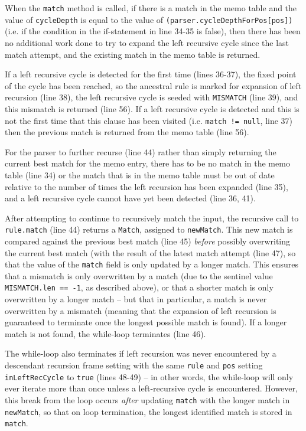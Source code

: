 \documentclass[manuscript]{acmart}
\begin{document}
When the \texttt{match} method is called, if there is a match in the memo table and the value of \texttt{cycleDepth} is equal to the value of \texttt{(parser.cycleDepthForPos[pos])} (i.e. if the condition in the if-statement in line 34-35 is false), then there has been no additional work done to try to expand the left recursive cycle since the last match attempt, and the existing match in the memo table is returned.

If a left recursive cycle is detected for the first time (lines 36-37), the fixed point of the cycle has been reached, so the ancestral rule is marked for expansion of left recursion (line 38), the left recursive cycle is seeded with \texttt{MISMATCH} (line 39), and this mismatch is returned (line 56). If a left recursive cycle is detected and this is not the first time that this clause has been visited (i.e. \texttt{match != null}, line 37) then the previous match is returned from the memo table (line 56).

For the parser to further recurse (line 44) rather than simply returning the current best match for the memo entry, there has to be no match in the memo table (line 34) or the match that is in the memo table must be out of date relative to the number of times the left recursion has been expanded (line 35), and a left recursive cycle cannot have yet been detected (line 36, 41).

After attempting to continue to recursively match the input, the recursive call to \texttt{rule.match} (line 44) returns a \texttt{Match}, assigned to \texttt{newMatch}. This new match is compared against the previous best match (line 45) \emph{before} possibly overwriting the current best match (with the result of the latest match attempt (line 47), so that the value of the \texttt{match} field is only updated by a longer match. This ensures that a mismatch is only overwritten by a match (due to the sentinel value \texttt{MISMATCH.len == -1}, as described above), or that a shorter match is only overwritten by a longer match -- but that in particular, a match is never overwritten by a mismatch (meaning that the expansion of left recursion is guaranteed to terminate once the longest possible match is found). If a longer match is not found, the while-loop terminates (line 46).

The while-loop also terminates if left recursion was never encountered by a descendant recursion frame setting with the same \texttt{rule} and \texttt{pos} setting \texttt{inLeftRecCycle} to \texttt{true} (lines 48-49) -- in other words, the while-loop will only ever iterate more than once unless a left-recursive cycle is encountered. However, this break from the loop occurs \emph{after} updating \texttt{match} with the longer match in \texttt{newMatch}, so that on loop termination, the longest identified match is stored in \texttt{match}.
\end{document}
